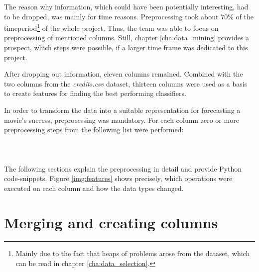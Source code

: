 The reason why information, which could have been potentially interesting, had to be dropped, was mainly for time reasons. Preprocessing took about 70\% of the timeperiod\footnote{Mainly due to the fact that heaps of problems arose from the dataset, which can be read in chapter \ref{cha:data_selection}.} of the whole project. Thus, the team was able to focus on preprocessing of mentioned columns. Still, chapter \ref{cha:data_mining} provides a prospect, which steps were possible, if a larger time frame was dedicated to this project.

After dropping out information, eleven columns remained. Combined with the two columns from the \textit{credits.csv} dataset, thirteen columns were used as a basis to create features for finding the best performing classifiers.

In order to transform the data into a suitable representation for forecasting a movie's success, preprocessing was mandatory. For each column zero or more preprocessing steps from the following list were performed:
\\ \\
\\ \\
The following sections explain the preprocessing in detail and provide Python code-snippets. Figure \ref{img:features} shows precisely, which operations were executed on each column and how the data types changed.


\section{Merging and creating columns}
\label{sec:merge_create}



